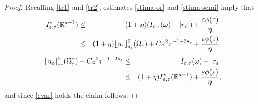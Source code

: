 \documentclass[11pt]{article}
\def\e{\varepsilon}
\begin{document}
\begin{proof}
Recalling \eqref{tr1} and \eqref{tr2}, estimates \eqref{stima-or} and \eqref{stima-semi} imply that 
\begin{eqnarray*}
I_{\e,\tau}^{\rm v}(\mathbb R^{d-1})&\leq&(1+\eta)(I_{\e,\tau}(\omega)+|r_\e|)+\frac{\e\phi(\e)}{\eta}\\
&\leq&(1+\eta)\lfloor u_\e\rfloor_{s_\e}^2(\Omega_\e)
+C\e^2\tau^{-1-2s_\e}
+\frac{\e\phi(\e)}{\eta}
\end{eqnarray*}
\begin{eqnarray*}
\lfloor u_\e\rfloor_{s_\e}^2(\Omega_\e^\tau)-C\e^2\tau^{-1-2s_\e}&\leq& I_{\e,\tau}(\omega)-|r_\e|\\
&\leq&(1+\eta)I_{\e,\tau}^{\rm v}(\mathbb R^{d-1})+\frac{\e\phi(\e)}{\eta}, 
\end{eqnarray*}
and since \eqref{cvar} holds the claim follows. \end{proof}





\end{document}
